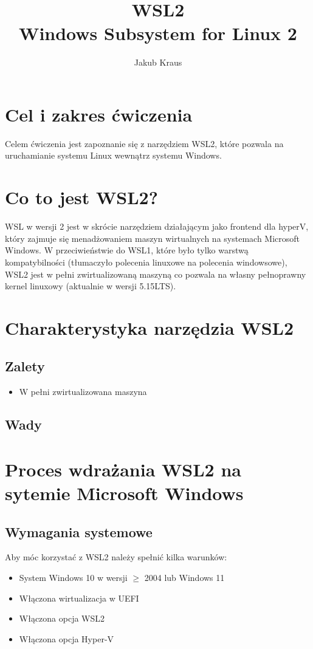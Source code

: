 \documentclass[a4paper,12pt]{article}
\title{WSL2 \\ \large{Windows Subsystem for Linux 2}}
\date{}
\author{Jakub Kraus}
\begin{document}
\maketitle
\section{Cel i zakres ćwiczenia}
Celem ćwiczenia jest zapoznanie się z narzędziem WSL2, które pozwala na uruchamianie systemu Linux wewnątrz systemu Windows.
\section{Co to jest WSL2?}
WSL w wersji 2 jest w skrócie narzędziem działającym jako frontend dla hyperV, który zajmuje się menadżowaniem maszyn wirtualnych na systemach Microsoft Windows. W przeciwieństwie do WSL1, które było tylko warstwą kompatybilności (tłumaczyło polecenia linuxowe na polecenia windowsowe), WSL2 jest w pełni zwirtualizowaną maszyną
co pozwala na własny pełnoprawny kernel linuxowy (aktualnie w wersji 5.15LTS).
\section{Charakterystyka narzędzia WSL2}
\subsection{Zalety}
\begin{itemize}
    \item W pełni zwirtualizowana maszyna
\end{itemize}
\subsection{Wady}
\section{Proces wdrażania WSL2 na sytemie Microsoft Windows}
\subsection{Wymagania systemowe}
Aby móc korzystać z WSL2 należy spełnić kilka warunków:
\begin{itemize}
    \item System Windows 10 w wersji $\geq$ 2004 lub Windows 11
    \item Włączona wirtualizacja w UEFI
    \item Włączona opcja WSL2
    \item Włączona opcja Hyper-V
\end{itemize}
\end{document}
